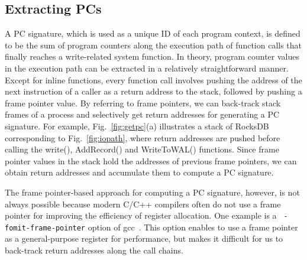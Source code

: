 \vspace{-10pt}
\subsection{Extracting PCs}
\vspace{-5pt}
A PC signature, which is used as a unique ID of each program context,
is defined
to be the sum of program counters along the execution path of function calls
that finally reaches a write-related system function.  In theory, program
counter values in the execution path can be extracted in a relatively
straightforward manner.  Except for inline functions, every function call
involves pushing the address of the next instruction of a caller as a return
address to the stack, followed by pushing a frame pointer value.  By referring
to frame pointers, we can back-track stack frames of a process and
selectively get return addresses for generating a PC signature.
For example, Fig.~\ref{fig:getpc}(a) illustrates a stack of RocksDB corresponding
to Fig.~\ref{fig:iopath}, where return addresses are pushed before calling
the \textsf{\small  write()}, \textsf{\small AddRecord()} and \textsf{\small
WriteToWAL()} functions.  Since frame pointer values in the stack hold the
addresses of previous frame pointers, we can obtain return addresses and
accumulate them to compute a PC signature.  


The frame pointer-based approach for computing a PC signature, however, is not
always possible because modern C/C++ compilers often do not use a frame pointer
for improving the efficiency of register allocation.  One example is a {\tt
-fomit-frame-pointer} option of gcc~\cite{GCC}.  This option enables to use a frame
pointer as a general-purpose register for performance, but makes it difficult for us
to back-track return addresses along the call chains.  

